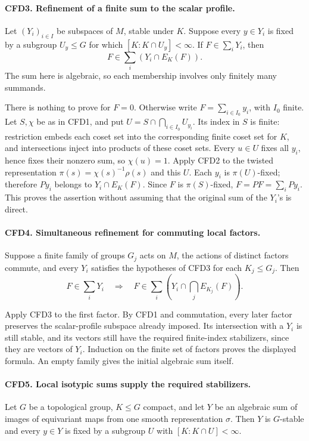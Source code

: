 \paragraph{CFD3. Refinement of a finite sum to the scalar profile.}
\label{claim:CFD3}
Let \((Y_i)_{i\in I}\) be subspaces of \(M\), stable under \(K\).
Suppose every \(y\in Y_i\) is fixed by a subgroup \(U_y\le G\) for
which \([K:K\cap U_y]<\infty\).  If
\(F\in\sum_iY_i\), then
\[
                         F\in\sum_i(Y_i\cap E_K(F)).
\]
The sum here is algebraic, so each membership involves only finitely many
summands.

There is nothing to prove for \(F=0\).  Otherwise write
\(F=\sum_{i\in I_0}y_i\), with \(I_0\) finite.  Let \(S,\chi\)
be as in CFD1, and put \(U=S\cap\bigcap_{i\in I_0}U_{y_i}\).
Its index in \(S\) is finite: restriction embeds each coset set into the
corresponding finite coset set for \(K\), and intersections inject into
products of these coset sets.  Every \(u\in U\) fixes all \(y_i\), hence
fixes their nonzero sum, so \(\chi(u)=1\).  Apply CFD2 to the twisted
representation \(\pi(s)=\chi(s)^{-1}\rho(s)\) and this \(U\).
Each \(y_i\) is \(\pi(U)\)-fixed; therefore \(Py_i\) belongs to
\(Y_i\cap E_K(F)\).  Since \(F\) is \(\pi(S)\)-fixed,
\(F=PF=\sum_iPy_i\).  This proves the assertion without assuming that
the original sum of the \(Y_i\)'s is direct.

\paragraph{CFD4. Simultaneous refinement for commuting local factors.}
\label{claim:CFD4}
Suppose a finite family of groups \(G_j\) acts on \(M\), the actions
of distinct factors commute, and every \(Y_i\) satisfies the hypotheses
of CFD3 for each \(K_j\le G_j\).  Then
\[
 F\in\sum_iY_i\quad\Longrightarrow\quad
 F\in\sum_i\left(Y_i\cap\bigcap_j E_{K_j}(F)\right).
\]

Apply CFD3 to the first factor.  By CFD1 and commutation, every later
factor preserves the scalar-profile subspace already imposed.  Its
intersection with a \(Y_i\) is still stable, and its vectors still have
the required finite-index stabilizers, since they are vectors of \(Y_i\).
Induction on the finite set of factors proves the displayed formula.
An empty family gives the initial algebraic sum itself.

\paragraph{CFD5. Local isotypic sums supply the required stabilizers.}
\label{claim:CFD5}
Let \(G\) be a topological group, \(K\le G\) compact, and let
\(Y\) be an algebraic sum of images of equivariant maps from one smooth
representation \(\sigma\).  Then \(Y\) is \(G\)-stable and every
\(y\in Y\) is fixed by a subgroup \(U\) with
\([K:K\cap U]<\infty\).

